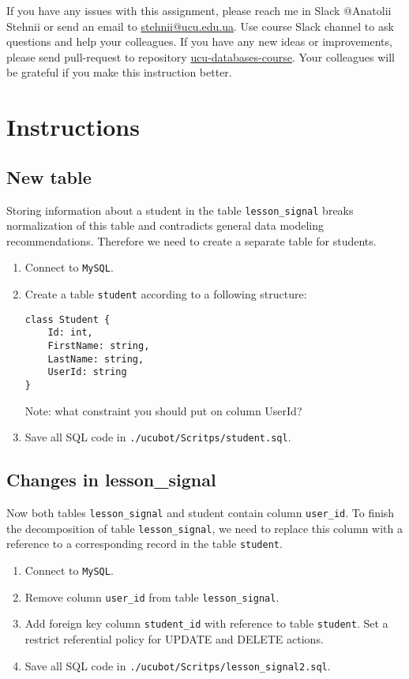 \documentclass[12pt]{article}
\newcommand{\code}[1]{\texttt{#1}}
\begin{document}
If you have any issues with this assignment, please reach me in Slack @Anatolii Stehnii or send an email to \href{mailto:stehnii@ucu.edu.ua}{stehnii@ucu.edu.ua}. Use course Slack channel to ask questions and help your colleagues. If you have any new ideas or improvements, please send pull-request to repository \href{https://github.com/tsdaemon/ucu-databases-course}{ucu-databases-course}. Your colleagues will be grateful if you make this instruction better.

\section*{Instructions}

\subsection*{New table}

Storing information about a student in the table \code{lesson\_signal} breaks normalization of this table and contradicts general data modeling recommendations. Therefore we need to create a separate table for students.

\begin{enumerate}
\item Connect to \code{MySQL}.
\item Create a table \code{student} according to a following structure:
\begin{verbatim}
class Student {
    Id: int,
    FirstName: string,
    LastName: string,
    UserId: string
}
\end{verbatim}
Note: what constraint you should put on column UserId?
\item Save all SQL code in \break \code{./ucubot/Scritps/student.sql}.
\end{enumerate}

\subsection*{Changes in lesson\_signal}

Now both tables \code{lesson\_signal} and {student} contain column \code{user\_id}. To finish the decomposition of table \code{lesson\_signal}, we need to replace this column with a reference to a corresponding record in the table \code{student}.

\begin{enumerate}

\item Connect to \code{MySQL}.
\item Remove column \code{user\_id} from table \code{lesson\_signal}.
\item Add foreign key column \code{student\_id} with reference to table \code{student}. Set a restrict referential policy for UPDATE and DELETE actions.
\item Save all SQL code in \break \code{./ucubot/Scritps/lesson\_signal2.sql}.

\end{enumerate}
\end{document}
